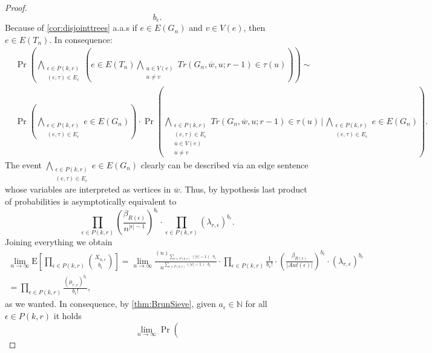 \documentclass[12pt,notitlepage,a4paper]{article}
\theoremstyle{definition}
\newcommand{\N}{\mathbb{N}}
\newcommand{\Ln}{\lim\limits_{n\to \infty}}
\begin{document}
\begin{proof}
\[		{b_\epsilon} .
		\]
		Because of \cref{cor:disjointtrees} a.a.s if $e\in E(G_n)$
		and $v\in V(e)$, then $e\in E(T_n)$. In consequence:
		\begin{align*}
		&\Pr\left(
		\bigwedge_{\substack{
				\epsilon\in P(k,r)\\
				(e, \tau)\in E_{\epsilon}
		}} \left(
		e\in E(T_n) \bigwedge_{\substack{
				u\in V(e)\\
				u\neq v}} Tr(G_n,\overline{w},u;r-1)
			\in \tau(u)		
		\right)
		\right)\sim\\
		&\Pr\left(
		\bigwedge_{\substack{
				\epsilon\in P(k,r)\\
				(e, \tau)\in E_{\epsilon}
		}} e\in E(G_n)
		\right)\cdot 		
		\Pr\left(
		\bigwedge_{\substack{
				\epsilon\in P(k,r)\\
				(e, \tau)\in E_{\epsilon}\\
				u\in V(e)\\
				u\neq v
		}}Tr(G_n,\overline{w},u;r-1)\in \tau(u)	
		\, \Bigg| \, 
		\bigwedge_{\substack{
		\epsilon\in P(k,r)\\
		(e, \tau)\in E_{\epsilon}
		}} e\in E(G_n)
		\right).
		\end{align*}
		The event 
		$ \bigwedge_{\substack{
				\epsilon\in P(k,r)\\
				(e, \tau)\in E_{\epsilon}
		}} e\in E(G_n)$ clearly can be described via an edge sentence
	whose variables are interpreted as vertices in $\overline{w}$. Thus,
	by hypothesis last product of probabilities is asymptotically equivalent
	to
	\[
	\prod_{\epsilon\in P(k,r)}
	\left(\frac{\beta_{R(\epsilon)}}
	{n^{|\epsilon|-1}}\right)^{b_\epsilon} \cdot
	\prod_{\epsilon\in P(k,r)} (\lambda_{r,\epsilon})^{b_\epsilon}.
	\]
	Joining everything we obtain 
	\begin{align*} 
	\Ln
	\mathrm{E}
	\left[
	\prod_{\epsilon\in P(k,r)} \binom{X_{n,\epsilon}}{b_\epsilon}	
	\right]
	= \Ln  
	\frac{(n)_{\sum_{\epsilon\in P(k,r)}(|\epsilon|-1)\cdot b_\epsilon}}
	{n^{\sum_{\epsilon\in P(k,r)}(|\epsilon|-1)\cdot b_\epsilon}}
	\cdot
	\prod_{\epsilon\in P(k,r)}
	\frac{1}{b_\epsilon!} \cdot
	\left( \frac{\beta_{R(\epsilon)}}{|Aut(\epsilon)|} \right)^
	{b_\epsilon} \cdot 
	(\lambda_{r,\epsilon})^{b_\epsilon}&\\
	= \prod_{\epsilon\in P(k,r)}
	\frac{\left( \mu_{r,\epsilon} \right)^
	{b_\epsilon}}{b_\epsilon!}
	,&
	\end{align*}
	as we wanted. In consequence, by \cref{thm:BrunSieve},
	given $a_{\epsilon}\in \N$ for all $\epsilon\in P(k,r)$
	it holds
	\[
	\Ln
	\Pr\left( 
\]
\end{proof}
\end{document}
